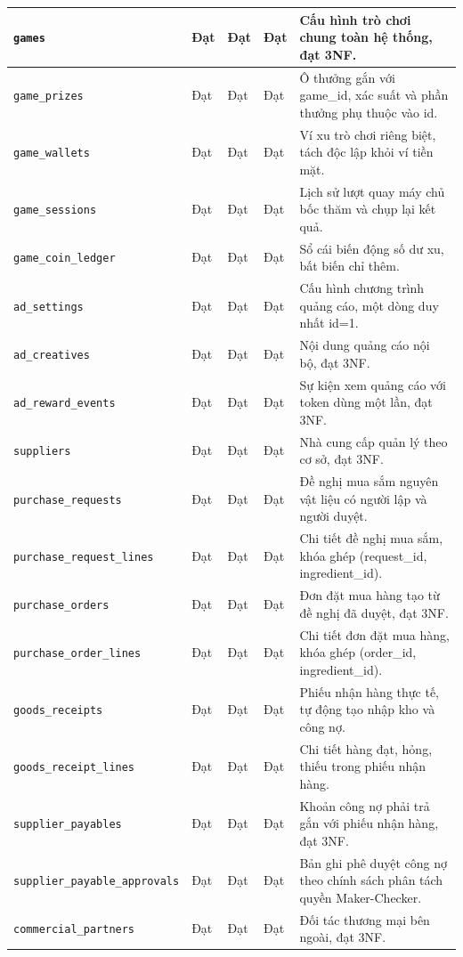 \begin{table}[htbp]
\begin{tabularx}{\textwidth}{|>{\raggedright\arraybackslash}p{3.2cm}|>{\centering\arraybackslash}p{1.0cm}|>{\centering\arraybackslash}p{1.0cm}|>{\centering\arraybackslash}p{1.6cm}|X|}
\hline
\texttt{games} & Đạt & Đạt & Đạt & Cấu hình trò chơi chung toàn hệ thống, đạt 3NF. \\
\hline
\texttt{game\_prizes} & Đạt & Đạt & Đạt & Ô thưởng gắn với game_id, xác suất và phần thưởng phụ thuộc vào id. \\
\hline
\texttt{game\_wallets} & Đạt & Đạt & Đạt & Ví xu trò chơi riêng biệt, tách độc lập khỏi ví tiền mặt. \\
\hline
\texttt{game\_sessions} & Đạt & Đạt & Đạt & Lịch sử lượt quay máy chủ bốc thăm và chụp lại kết quả. \\
\hline
\texttt{game\_coin\_ledger} & Đạt & Đạt & Đạt & Sổ cái biến động số dư xu, bất biến chỉ thêm. \\
\hline
\texttt{ad\_settings} & Đạt & Đạt & Đạt & Cấu hình chương trình quảng cáo, một dòng duy nhất id=1. \\
\hline
\texttt{ad\_creatives} & Đạt & Đạt & Đạt & Nội dung quảng cáo nội bộ, đạt 3NF. \\
\hline
\texttt{ad\_reward\_events} & Đạt & Đạt & Đạt & Sự kiện xem quảng cáo với token dùng một lần, đạt 3NF. \\
\hline
\texttt{suppliers} & Đạt & Đạt & Đạt & Nhà cung cấp quản lý theo cơ sở, đạt 3NF. \\
\hline
\texttt{purchase\_requests} & Đạt & Đạt & Đạt & Đề nghị mua sắm nguyên vật liệu có người lập và người duyệt. \\
\hline
\texttt{purchase\_request\_lines} & Đạt & Đạt & Đạt & Chi tiết đề nghị mua sắm, khóa ghép (request_id, ingredient_id). \\
\hline
\texttt{purchase\_orders} & Đạt & Đạt & Đạt & Đơn đặt mua hàng tạo từ đề nghị đã duyệt, đạt 3NF. \\
\hline
\texttt{purchase\_order\_lines} & Đạt & Đạt & Đạt & Chi tiết đơn đặt mua hàng, khóa ghép (order_id, ingredient_id). \\
\hline
\texttt{goods\_receipts} & Đạt & Đạt & Đạt & Phiếu nhận hàng thực tế, tự động tạo nhập kho và công nợ. \\
\hline
\texttt{goods\_receipt\_lines} & Đạt & Đạt & Đạt & Chi tiết hàng đạt, hỏng, thiếu trong phiếu nhận hàng. \\
\hline
\texttt{supplier\_payables} & Đạt & Đạt & Đạt & Khoản công nợ phải trả gắn với phiếu nhận hàng, đạt 3NF. \\
\hline
\texttt{supplier\_payable\_approvals} & Đạt & Đạt & Đạt & Bản ghi phê duyệt công nợ theo chính sách phân tách quyền Maker-Checker. \\
\hline
\texttt{commercial\_partners} & Đạt & Đạt & Đạt & Đối tác thương mại bên ngoài, đạt 3NF. \\

\end{tabularx}
\end{table}
